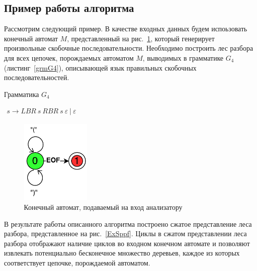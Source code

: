 \subsection{Пример работы алгоритма}
Рассмотрим следующий пример. В качестве входных данных будем испоьзовать конечный автомат $M$, представленный на рис.~\ref{InputGraph}, который генерирует произвольные скобочные последовательности. Необходимо построить лес разбора для всех цепочек, порождаемых автоматом $M$, выводимых в грамматике $G_4$ (листинг~\ref{grmG4}), описывающей язык правильных скобочных последовательностей.
\begin{listing}
\caption{Грамматика $G_4$}
\label{grmG4}
\centering
$\begin{array}{rl}
s \rightarrow LBR \ s \ RBR \ s \ \varepsilon \  | \ \varepsilon 
\end{array}$
\end{listing}

\begin{figure}
 \centering
 \includegraphics[width=0.3\textwidth]{Ragozina/pics/ExampleInputGraph.pdf}
 \caption{Конечный автомат, подаваемый на вход анализатору }
 \label{InputGraph}
\end{figure}

В результате работы описанного алгоритма построено сжатое представление леса разбора, представленное на рис.~\ref{ExSppf}. Циклы в сжатом представлении леса разбора отображают наличие циклов во входном конечном автомате и позволяют извлекать потенциально бесконечное множество деревьев, каждое из которых соответствует цепочке, порождаемой автоматом.

